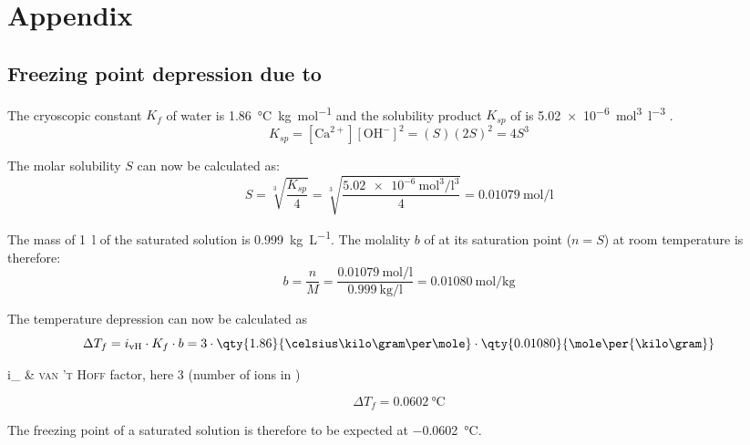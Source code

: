 \renewcommand{\thechapter}{C}
\chapter{Appendix}



\section{Freezing point depression due to }
\label{sec:freezing-point-depression}

The cryoscopic constant $K_{f}$ of water is \qty{1.86}{\celsius\kilo\gram\per\mole} and the solubility product $K_{sp}$ of  is \qty{5.02e-6}{\mole\cubed\per\litre\cubed} \cite{haynes.2017}.
\begin{equation}
    K_{sp} = [\text{Ca}^{2+}][\text{OH}^{-}]^2 = (S)(2S)^2 = 4S^3
\end{equation}

The molar solubility $S$ can now be calculated as:
\begin{equation}
	S = \sqrt[3]{ \frac{K_{sp}}{4}} = \sqrt[3]{ \frac{\qty{5.02e-6}{\mole\cubed\per\litre\cubed}}{4}} = \qty{0.01079}{\mole\per\litre}
\end{equation}

The mass of \qty{1}{\litre} of the saturated  solution is \qty{0.999}{\kilo\gram\per\liter}.
The molality $b$ of  at its saturation point ($n=S$) at room temperature is therefore:
\begin{equation}
	b = \frac{n}{M}  = \frac{\qty{0.01079}{\mole\per\litre}}{\qty{0.999}{\kilo\gram\per\litre}} = \qty{0.01080}{\mole\per\kilo\gram}
\end{equation}

The temperature depression can now be calculated as 
\begin{equation}
	\Delta T_f = i_\text{vH} \cdot K_f \cdot b = 3 \cdot \qty{1.86}{\celsius\kilo\gram\per\mole} \cdot \qty{0.01080}{\mole\per{\kilo\gram}}
\end{equation}
\begin{conditions}
	i_	&	\textsc{van 't Hoff} factor, here \num{3} (number of ions in )
\end{conditions}
\begin{equation}
	\Delta T_f = \qty{0.0602}{\celsius}
\end{equation}

The freezing point of a saturated  solution is therefore to be expected at \qty{-0.0602}{\celsius}.

